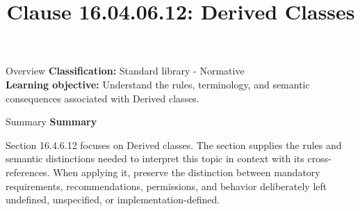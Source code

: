 \documentclass[10pt,letterpaper]{article}
\title{Clause 16.04.06.12: Derived Classes}
\author{}
\date{}
\begin{document}
\maketitle
\begin{CornellOverviewBox}{Overview}
\textbf{Classification:} Standard library - Normative\\[2pt]
\textbf{Learning objective:} Understand the rules, terminology, and semantic consequences associated with Derived classes.
\end{CornellOverviewBox}\begin{CornellSummaryBox}{Summary}
{\sffamily\bfseries\color{Accent} Summary}\par\vspace{3pt}Section 16.4.6.12 focuses on Derived classes. The section supplies the rules and semantic distinctions needed to interpret this topic in context with its cross-references. When applying it, preserve the distinction between mandatory requirements, recommendations, permissions, and behavior deliberately left undefined, unspecified, or implementation-defined.
\end{CornellSummaryBox}
\end{document}
